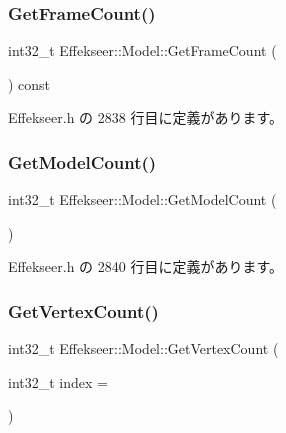 \subsubsection{\texorpdfstring{Get\+Frame\+Count()}{GetFrameCount()}}
{\footnotesize\ttfamily int32\+\_\+t Effekseer\+::\+Model\+::\+Get\+Frame\+Count (\begin{DoxyParamCaption}{ }\end{DoxyParamCaption}) const\hspace{0.3cm}{\ttfamily [inline]}}



 Effekseer.\+h の 2838 行目に定義があります。

\mbox{\label{class_effekseer_1_1_model_ad91886d20e51178e39575730791d011f}} 
\subsubsection{\texorpdfstring{Get\+Model\+Count()}{GetModelCount()}}
{\footnotesize\ttfamily int32\+\_\+t Effekseer\+::\+Model\+::\+Get\+Model\+Count (\begin{DoxyParamCaption}{ }\end{DoxyParamCaption})\hspace{0.3cm}{\ttfamily [inline]}}



 Effekseer.\+h の 2840 行目に定義があります。

\mbox{\label{class_effekseer_1_1_model_a63308d170d52e2b12fd1a479f5e6ccf1}} 
\subsubsection{\texorpdfstring{Get\+Vertex\+Count()}{GetVertexCount()}}
{\footnotesize\ttfamily int32\+\_\+t Effekseer\+::\+Model\+::\+Get\+Vertex\+Count (\begin{DoxyParamCaption}\item[{int32\+\_\+t}]{index = {} }\end{DoxyParamCaption})\hspace{0.3cm}{\ttfamily [inline]}}



